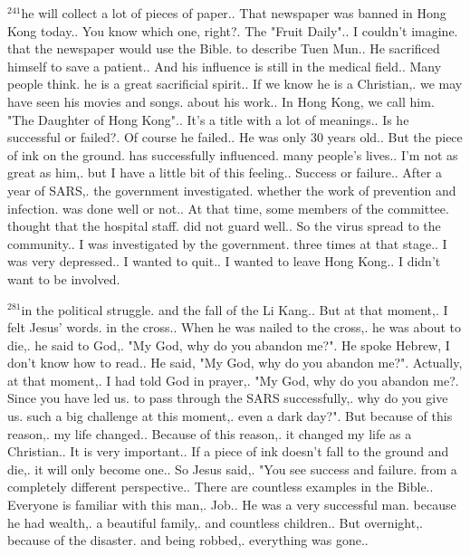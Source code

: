 \documentclass{book}
\begin{document}
$^{241}$he will collect a lot of pieces of paper..
That newspaper was banned in Hong Kong today..
You know which one, right?.
The "Fruit Daily"..
I couldn't imagine.
that the newspaper would use the Bible.
to describe Tuen Mun..
He sacrificed himself to save a patient..
And his influence is still in the medical field..
Many people think.
he is a great sacrificial spirit..
If we know he is a Christian,.
we may have seen his movies and songs.
about his work..
In Hong Kong, we call him.
"The Daughter of Hong Kong"..
It's a title with a lot of meanings..
Is he successful or failed?.
Of course he failed..
He was only 30 years old..
But the piece of ink on the ground.
has successfully influenced.
many people's lives..
I'm not as great as him,.
but I have a little bit of this feeling..
Success or failure..
After a year of SARS,.
the government investigated.
whether the work of prevention and infection.
was done well or not..
At that time, some members of the committee.
thought that the hospital staff.
did not guard well..
So the virus spread to the community..
I was investigated by the government.
three times at that stage..
I was very depressed..
I wanted to quit..
I wanted to leave Hong Kong..
I didn't want to be involved.

$^{281}$in the political struggle.
and the fall of the Li Kang..
But at that moment,.
I felt Jesus' words.
in the cross..
When he was nailed to the cross,.
he was about to die,.
he said to God,.
"My God, why do you abandon me?".
He spoke Hebrew, I don't know how to read..
He said, "My God, why do you abandon me?".
Actually, at that moment,.
I had told God in prayer,.
"My God, why do you abandon me?.
Since you have led us.
to pass through the SARS successfully,.
why do you give us.
such a big challenge at this moment,.
even a dark day?".
But because of this reason,.
my life changed..
Because of this reason,.
it changed my life as a Christian..
It is very important..
If a piece of ink doesn't fall to the ground and die,.
it will only become one..
So Jesus said,.
"You see success and failure.
from a completely different perspective..
There are countless examples in the Bible..
Everyone is familiar with this man,.
Job..
He was a very successful man.
because he had wealth,.
a beautiful family,.
and countless children..
But overnight,.
because of the disaster.
and being robbed,.
everything was gone..
\end{document}
